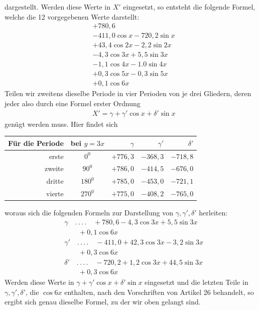 dargestellt. Werden diese Werte in $X'$ eingesetzt, so entsteht die folgende Formel, welche die 12 vorgegebenen Werte darstellt:
\[
\begin{aligned}
&+780{,}6\\[5pt]
&-411{,}0\cos x-720{,}2\sin x\\[5pt]
&+43{,}4\cos2x-2{,}2\sin2x\\[5pt]
&-4{,}3\cos3x+5{,}5\sin3x\\[5pt]
&-1{,}1\cos4x-1.0\sin4x\\[5pt]
&+0{,}3\cos5x-0{,}3\sin5x\\[5pt]
&+0{,}1\cos6x
\end{aligned}
\]
Teilen wir zweitens dieselbe Periode in vier Perioden von je drei Gliedern, deren jeder also durch eine Formel erster Ordnung
\[
\begin{aligned}
&X'=\gamma+\gamma'\cos x+\delta'\sin x
\end{aligned}
\]
genügt werden muss. Hier findet sich
\begin{center}
\begin{tabular}{r|c|r|r|r}
Für die Periode & bei $y=3x$ & $\gamma$ & $\gamma'$ & $\delta'$\\\hline
erste & $0^{0}$ & $+776{,}3$ & $-368{,}3$ & $-718{,}8$\\
zweite & $90^{0}$ & $+786{,}0$ & $-414{,}5$ & $-676{,}0$\\
dritte & $180^{0}$ & $+785{,}0$ & $-453{,}0$ & $-721{,}1$\\
vierte & $270^{0}$ & $+775{,}0$ & $-408{,}2$ & $-765{,}0$
\end{tabular}
\end{center}
woraus sich die folgenden Formeln zur Darstellung von $\gamma,\gamma',\delta'$ herleiten:
\[
\begin{aligned}
&\gamma\quad.\,.\,.\,.\quad+780{,}6-4{,}3\cos3x+5{,}5\sin3x\\[5pt]
&\qquad{}+0{,}1\cos6x\\[5pt]
&\gamma'\quad.\,.\,.\,.\quad-411{,}0+42{,}3\cos3x-3{,}2\sin3x\\[5pt]
&\qquad{}+0{,}3\cos6x\\[5pt]
&\delta'\quad.\,.\,.\,.\quad-720{,}2+1{,}2\cos3x+44{,}5\sin3x\\[5pt]
&\qquad{}+0{,}3\cos6x
\end{aligned}
\]
Werden diese Werte in $\gamma+\gamma'\cos x+\delta'\sin x$ eingesetzt und die letzten Teile in $\gamma,\gamma',\delta'$, die $\cos6x$ enthalten, nach den Vorschriften von Artikel 26 behandelt, so ergibt sich genau dieselbe Formel, zu der wir oben gelangt sind.
\endgroup
